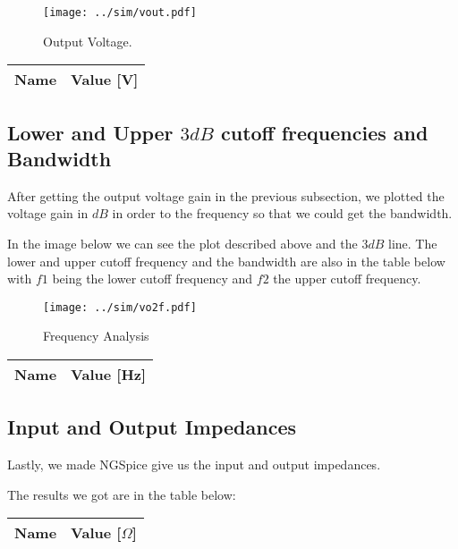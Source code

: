 \begin{figure}[H] \centering
\texttt{[image: ../sim/vout.pdf]}
\caption{Output Voltage.}
\label{fig:output}
\end{figure}

\begin{table}[H]
  \centering
  \begin{tabular}{|l|r|}
    \hline    
    {\bf Name} & {\bf Value [V]} \\ \hline
    
  \end{tabular}
  \label{tab:voltage}
\end{table}

\subsection{Lower and Upper $3dB$ cutoff frequencies and Bandwidth}
After getting the output voltage gain in the previous subsection, we plotted the voltage gain in $dB$ in order to the frequency so that we could get the bandwidth. \par
In the image below we can see the plot described above and the $3dB$ line. The lower and upper cutoff frequency and the bandwidth are also in the table below with $f1$ being the lower cutoff frequency and $f2$ the upper cutoff frequency.

\begin{figure}[H] \centering
\texttt{[image: ../sim/vo2f.pdf]}
\caption{Frequency Analysis}
\label{fig:frequency}
\end{figure}

\begin{table}[H]
  \centering
  \begin{tabular}{|l|r|}
    \hline    
    {\bf Name} & {\bf Value [Hz]} \\ \hline
    
  \end{tabular}
  \label{tab:bandwidth}
\end{table}

\subsection{Input and Output Impedances}
Lastly, we made NGSpice give us the input and output impedances. \par
The results we got are in the table below: 

\begin{table}[H]
  \centering
  \begin{tabular}{|l|r|}
    \hline    
    {\bf Name} & {\bf Value [$\Omega$]} \\ \hline
    
  \end{tabular}
  \label{tab:impedance}
\end{table}




